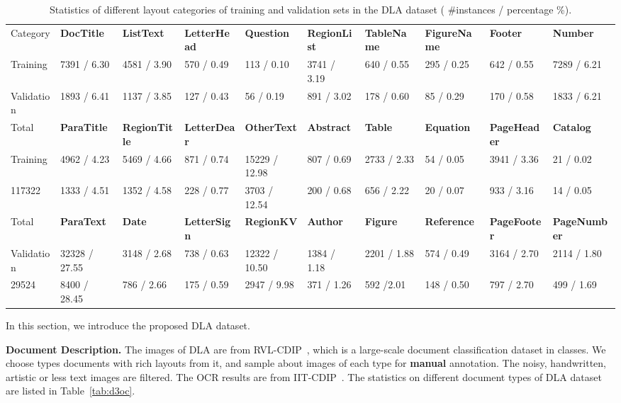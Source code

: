 \documentclass[10pt,twocolumn,letterpaper]{article}
\newcommand{\ra}[1]{\renewcommand{\arraystretch}{#1}}
\begin{document}
\begin{table*}[t]\centering
\small
\setlength{\tabcolsep}{2pt}
\ra{1.2}
\caption{Statistics of different layout categories of training and validation sets in the DLA dataset ( \#instances / percentage \%).}
\label{tab:V12_cats}
\begin{tabular}{|l|l|l|l|l|l|l|l|l|l|}
\hline
Category & \textbf{DocTitle} & \textbf{ListText} & \textbf{LetterHead} & \textbf{Question} & \textbf{RegionList}  &\textbf{TableName}  &\textbf{FigureName}  &\textbf{Footer} &\textbf{Number} \\
\cline{2-10}
Training & 7391 / 6.30 & 4581 / 3.90 & 570 / 0.49	& 113 / 0.10  & 3741 / 3.19 & 640  / 0.55 & 295 / 0.25  & 642 /  0.55 & 7289 / 6.21 \\
Validation & 1893 / 6.41 & 1137 / 3.85 & 127 / 0.43	&  56 / 0.19 & 891 / 3.02 &  178 / 0.60 & 85 / 0.29  &  170 / 0.58 &  1833 / 6.21 \\
\hline
Total & \textbf{ParaTitle} & \textbf{RegionTitle} &\textbf{LetterDear}   &\textbf{OtherText}  & \textbf{Abstract} &\textbf{Table} & \textbf{Equation}  & \textbf{PageHeader}  & \textbf{Catalog} \\
\cline{2-10}
Training  & 4962 / 4.23 & 5469 / 4.66  &   871 / 0.74 &  15229 / 12.98 & 807 / 0.69  & 2733 / 2.33  &  54 / 0.05 & 3941 /  3.36 & 21 / 0.02   \\
117322 &   1333 / 4.51 &  1352 / 4.58  &  228 / 0.77 &  3703 / 12.54  &  200 / 0.68  &  656 / 2.22  &   20 / 0.07 & 933 / 3.16  & 14 / 0.05 \\
\hline
Total & \textbf{ParaText} & \textbf{Date} &\textbf{LetterSign}   &\textbf{RegionKV}  & \textbf{Author} &\textbf{Figure} & \textbf{Reference}  & \textbf{PageFooter}  & \textbf{PageNumber} \\
\cline{2-10}
Validation & 32328 / 27.55  & 3148 / 2.68 & 738 / 0.63 	& 12322 / 10.50   & 1384 / 1.18  &  2201 / 1.88  & 574 / 0.49  & 3164 / 2.70 &  2114 / 1.80  \\
29524 & 8400 / 28.45 &  786 / 2.66 & 175 / 0.59	& 2947 / 9.98   & 371 / 1.26  & 592 /2.01 &  148 / 0.50 & 797 / 2.70 & 499 / 1.69  \\
\hline
\end{tabular}
\end{table*}

In this section, we introduce the proposed DLA dataset.


\noindent
\textbf{Document Description.}
The images of DLA are from RVL-CDIP~\cite{rvl}, which is a large-scale document classification dataset in  classes.
We choose  types documents with rich layouts from it,
and sample about  images of each type for \textbf{manual} annotation.
The noisy, handwritten, artistic or less text images are filtered.
The OCR results are from IIT-CDIP~\cite{iit}.
The statistics on different document types of DLA dataset are listed in Table~\ref{tab:d3oc}.
\end{document}
